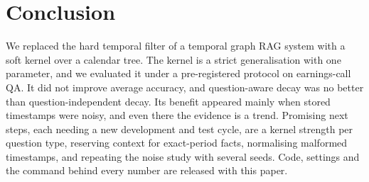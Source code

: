 \section{Conclusion}
We replaced the hard temporal filter of a temporal graph RAG system with a soft kernel over a calendar tree. The kernel is a strict generalisation with one parameter, and we evaluated it under a pre-registered protocol on earnings-call QA. It did not improve average accuracy, and question-aware decay was no better than question-independent decay. Its benefit appeared mainly when stored timestamps were noisy, and even there the evidence is a trend. Promising next steps, each needing a new development and test cycle, are a kernel strength per question type, reserving context for exact-period facts, normalising malformed timestamps, and repeating the noise study with several seeds. Code, settings and the command behind every number are released with this paper.
